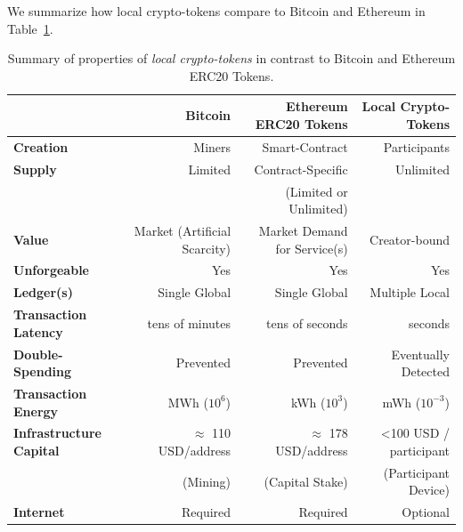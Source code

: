 \documentclass[sigplan,screen,10pt,review,anonymous]{acmart}
\begin{document}
We summarize how local crypto-tokens compare to Bitcoin and Ethereum in Table~\ref{tb:properties}.

\begin{table}[t]
\caption{Summary of properties of \textit{local crypto-tokens} in contrast to Bitcoin and Ethereum ERC20 Tokens.}
\label{tb:properties}
\begin{tabular}{l|r|r|r|}
              & \textbf{Bitcoin} & \textbf{Ethereum ERC20 Tokens} & \textbf{Local Crypto-Tokens} \\
\hline
\textbf{Creation}        & Miners                              & Smart-Contract         & Participants \\
\textbf{Supply}           & Limited                             & Contract-Specific      & Unlimited \\
                                   &                                         & (Limited or Unlimited) & \\
\textbf{Value}             & Market (Artificial Scarcity) & Market Demand for Service(s) & Creator-bound \\
\textbf{Unforgeable}   & Yes                                   & Yes                                                             & Yes \\
\textbf{Ledger(s)}            & Single Global               & Single Global                        & Multiple Local \\
\textbf{Transaction Latency} & tens of minutes      & tens of seconds                                                      & seconds \\
\textbf{Double-Spending} & Prevented                 & Prevented                                                 & Eventually Detected \\
\textbf{Transaction Energy} & MWh  ($10^{6}$)                             & kWh   ($10^3$)                                               & mWh ($10^{-3}$) \\
\textbf{Infrastructure Capital} & $\approx$ 110 USD/address
                                    & $\approx$ 178 USD/address   
                                    & <100 USD / participant \\
                                    & (Mining)      &  (Capital Stake)  & (Participant Device)  \\
\textbf{Internet} & Required                            & Required                                  & Optional \\
\end{tabular}
\end{table}
\end{document}
